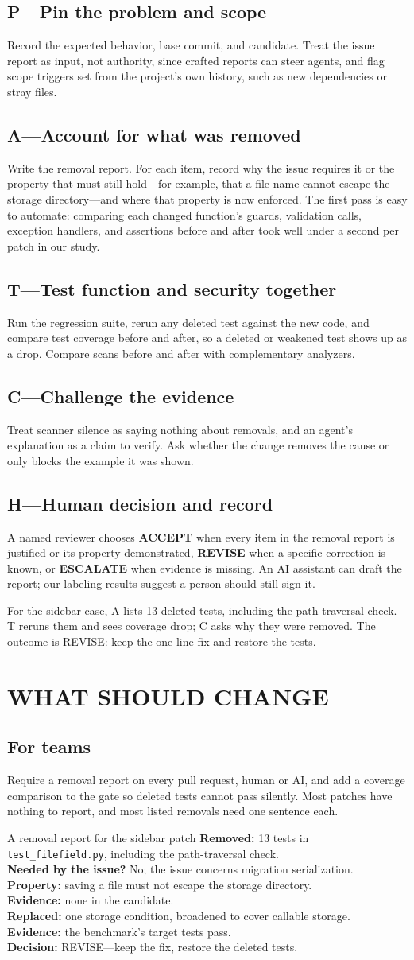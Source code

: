\documentclass[10pt,journal,compsoc]{IEEEtran}
\newcommand{\mgsection}[1]{\section*{\MakeUppercase{#1}}}
\newcommand{\mgsub}[1]{\subsection*{#1}}
\begin{document}
\mgsub{P---Pin the problem and scope}
Record the expected behavior, base commit, and candidate. Treat the issue report
as input, not authority, since crafted reports can steer
agents,\cite{przymus2026adversarial} and flag scope triggers set from the
project's own history, such as new dependencies or stray files.

\mgsub{A---Account for what was removed}
Write the removal report. For each item, record why the issue requires it or the
property that must still hold---for example, that a file name cannot escape the
storage directory---and where that property is now enforced. The first pass is
easy to automate: comparing each changed function's guards, validation calls,
exception handlers, and assertions before and after took well under a second per
patch in our study.

\mgsub{T---Test function and security together}
Run the regression suite, rerun any deleted test against the new code, and
compare test coverage before and after, so a deleted or weakened test shows up
as a drop. Compare scans before and after with complementary analyzers.

\mgsub{C---Challenge the evidence}
Treat scanner silence as saying nothing about removals, and an agent's
explanation as a claim to verify. Ask whether the change removes the cause or
only blocks the example it was shown.

\mgsub{H---Human decision and record}
A named reviewer chooses \textbf{ACCEPT} when every item in the removal report is
justified or its property demonstrated, \textbf{REVISE} when a specific
correction is known, or \textbf{ESCALATE} when evidence is missing. An AI
assistant can draft the report; our labeling results suggest a person should
still sign it.

For the sidebar case, A lists 13 deleted tests, including the path-traversal
check. T reruns them and sees coverage drop; C asks why they were removed. The
outcome is REVISE: keep the one-line fix and restore the tests.

\mgsection{What should change}

\mgsub{For teams}
Require a removal report on every pull request, human or AI, and add a coverage
comparison to the gate so deleted tests cannot pass silently. Most patches have
nothing to report, and most listed removals need one sentence each.

\begin{mgbox}{A removal report for the sidebar patch}
\small
\textbf{Removed:} 13 tests in \texttt{test\_filefield.py}, including the
path-traversal check.\\
\textbf{Needed by the issue?} No; the issue concerns migration serialization.\\
\textbf{Property:} saving a file must not escape the storage directory.\\
\textbf{Evidence:} none in the candidate.\\
\textbf{Replaced:} one storage condition, broadened to cover callable storage.\\
\textbf{Evidence:} the benchmark's target tests pass.\\
\textbf{Decision:} REVISE---keep the fix, restore the deleted tests.
\end{mgbox}
\end{document}
